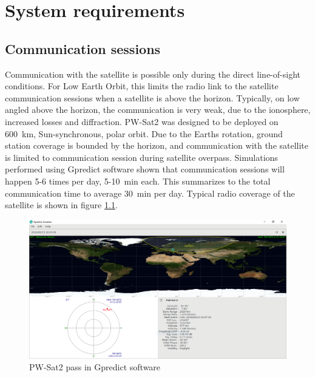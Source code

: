 \chapter{System requirements}
\section{Communication sessions}
Communication with the satellite is possible only during the direct line-of-sight conditions. For Low Earth Orbit, this limits the radio link to the satellite communication sessions when a satellite is above the horizon. Typically, on low angled above the horizon, the communication is very weak, due to the ionosphere, increased losses and diffraction.
PW-Sat2 was designed to be deployed on \SI{600}{\kilo\meter}, Sun-synchronous, polar orbit. Due to the Earths rotation, ground station coverage is bounded by the horizon, and communication with the satellite is limited to communication session during satellite overpass. Simulations performed using Gpredict software \cite{gpredict_website} shown that communication sessions will happen \si{5}-\si{6} times per day, \si{5}-\SI{10}{\minute} each. This summarizes to the total communication time to average \SI{30}{\minute} per day. Typical radio coverage of the satellite is shown in figure \ref{gpredict_pass}.

\begin{figure}[h]
    \centering
    \includegraphics[width=0.8\paperwidth]{img/5/gpredict_pass.png}
    \caption{PW-Sat2 pass in Gpredict software}
    \label{gpredict_pass}
\end{figure}


